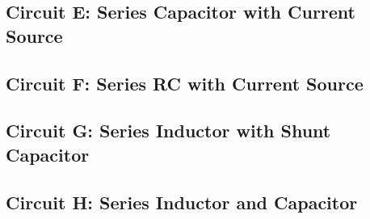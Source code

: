 \documentclass[main.tex]{subfiles}
\begin{document}
\subsection{Circuit E: Series Capacitor with Current Source}

\subsection{Circuit F: Series RC with Current Source}

\subsection{Circuit G: Series Inductor with Shunt Capacitor}

\subsection{Circuit H: Series Inductor and Capacitor}
\end{document}

